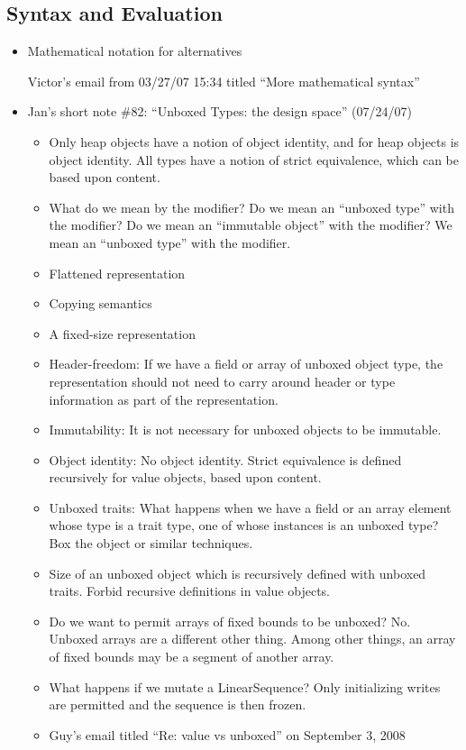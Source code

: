 \subsection{Syntax and Evaluation}
\begin{itemize}
\item Mathematical notation for alternatives

Victor's email from 03/27/07 15:34
titled ``More mathematical syntax''

\item Jan's short note \#82: ``Unboxed Types: the design space'' (07/24/07)
 \begin{itemize}
\item Only heap objects have a notion of object identity, and for heap objects
 is object identity. All types have a notion of strict equivalence, which can be based upon content.
\item What do we mean by the  modifier? Do we mean an ``unboxed type'' with the  modifier? Do we mean an ``immutable object'' with the  modifier? We mean an ``unboxed type'' with the  modifier.
\item Flattened representation
\item Copying semantics
\item A fixed-size representation
\item Header-freedom: If we have a field or array of unboxed object type, the representation should not need to carry around header or type information as part of the representation.
\item Immutability: It is not necessary for unboxed objects to be immutable.
\item Object identity: No object identity. Strict equivalence is defined recursively for value objects, based upon content.
\item Unboxed traits: What happens when we have a field or an array element whose type is a trait type, one of whose instances is an unboxed type? Box the object or similar techniques.
\item Size of an unboxed object which is recursively defined with unboxed traits. Forbid recursive definitions in value objects.
\item Do we want to permit arrays of fixed bounds to be unboxed? No. Unboxed arrays are a different other thing. Among other things, an array of fixed bounds may be a segment of another array.
\item What happens if we mutate a LinearSequence? Only initializing writes are permitted and the sequence is then frozen.
\item Guy's email titled ``Re: value vs unboxed'' on September 3, 2008
 \end{itemize}


\end{itemize}
